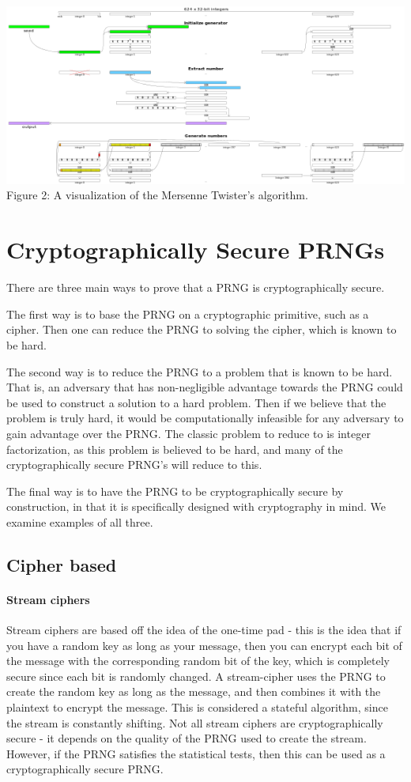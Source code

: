 \documentclass[11pt]{article}
\begin{document}
\includegraphics[scale = .85]{MT_v}
Figure 2: A visualization of the Mersenne Twister's algorithm. 
\section{Cryptographically Secure PRNGs}
There are three main ways to prove that a PRNG is cryptographically secure. 

The first way is to base the PRNG on a cryptographic primitive, such as a cipher. Then one can reduce the PRNG to solving the cipher, which is known to be hard.

The second way is to reduce the PRNG to a problem that is known to be hard. That is, an adversary that has non-negligible advantage towards the PRNG could be used to construct a solution to a hard problem. Then if we believe that the problem is truly hard, it would be computationally infeasible for any adversary to gain advantage over the PRNG. The classic problem to reduce to is integer factorization, as this problem is believed to be hard, and many of the cryptographically secure PRNG's will reduce to this.

The final way is to have the PRNG to be cryptographically secure by construction, in that it is specifically designed with cryptography in mind. We examine examples of all three. 
\subsection{Cipher based}
\paragraph{Stream ciphers}
Stream ciphers are based off the idea of the one-time pad - this is the idea that if you have a random key as long as your message, then you can encrypt each bit of the message with the corresponding random bit of the key, which is completely secure since each bit is randomly changed. A stream-cipher uses the PRNG to create the random key as long as the message, and then combines it with the plaintext to encrypt the message. This is considered a stateful algorithm, since the stream is constantly shifting. Not all stream ciphers are cryptographically secure - it depends on the quality of the PRNG used to create the stream. However, if the PRNG satisfies the statistical tests, then this can be used as a cryptographically secure PRNG.
\end{document}
